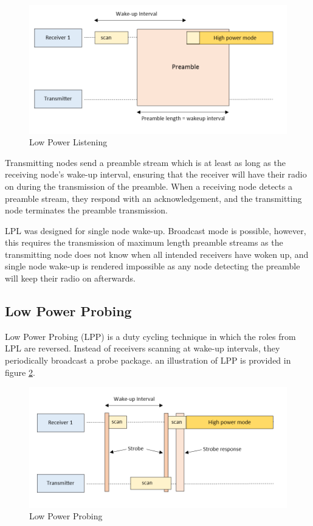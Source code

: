     \FloatBarrier
    \begin{figure}[ht]
      \includegraphics[width=\textwidth]{Images/chapter2/lpl.png}
      \caption{Low Power Listening}
      \label{fig:lpl}
    \end{figure}
    \FloatBarrier

    Transmitting nodes send a preamble stream which is at least as long as the
    receiving node's wake-up interval, ensuring that the receiver will have their
    radio on during the transmission of the preamble. When a receiving node detects
    a preamble stream, they respond with an acknowledgement, and the transmitting
    node terminates the preamble transmission.

    LPL was designed for single node wake-up. Broadcast mode is possible, however,
    this requires the transmission of maximum length preamble streams as the transmitting
    node does not know when all intended receivers have woken up, and single node
    wake-up is rendered impossible as any node detecting the preamble will keep
    their radio on afterwards.

      \subsection{Low Power Probing}
    Low Power Probing (LPP) \cite{LPP} is a duty cycling technique in which the roles from LPL
    are reversed. Instead of receivers scanning at wake-up intervals, they periodically
    broadcast a probe package. an illustration of LPP is provided in figure \ref{fig:lpp}.

    \FloatBarrier
    \begin{figure}[ht]
      \includegraphics[width=\textwidth]{Images/chapter2/lpp.png}
      \caption{Low Power Probing}
      \label{fig:lpp}
    \end{figure}
    \FloatBarrier

